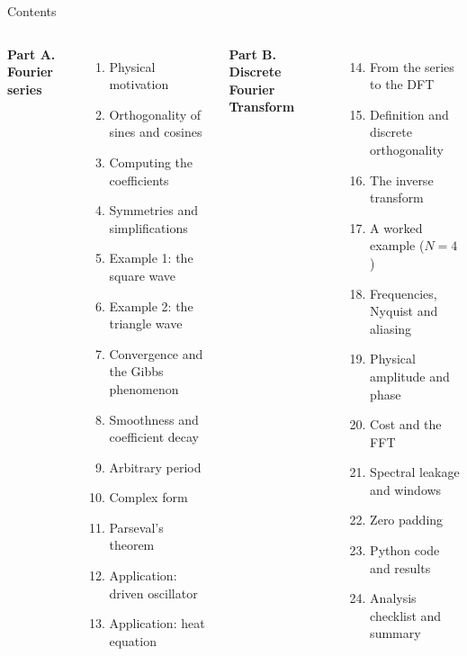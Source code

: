 \documentclass[aspectratio=169,10pt]{beamer}
\begin{document}
\begin{frame}{Contents}
  \footnotesize
  \begin{columns}[T]
    \textbf{Part A. Fourier series}
    \begin{enumerate}
      \item Physical motivation
      \item Orthogonality of sines and cosines
      \item Computing the coefficients
      \item Symmetries and simplifications
      \item Example 1: the square wave
      \item Example 2: the triangle wave
      \item Convergence and the Gibbs phenomenon
      \item Smoothness and coefficient decay
      \item Arbitrary period
      \item Complex form
      \item Parseval's theorem
      \item Application: driven oscillator
      \item Application: heat equation
    \end{enumerate}
    \textbf{Part B. Discrete Fourier Transform}
    \begin{enumerate}\setcounter{enumi}{13}
      \item From the series to the DFT
      \item Definition and discrete orthogonality
      \item The inverse transform
      \item A worked example ($N=4$)
      \item Frequencies, Nyquist and aliasing
      \item Physical amplitude and phase
      \item Cost and the FFT
      \item Spectral leakage and windows
      \item Zero padding
      \item Python code and results
      \item Analysis checklist and summary
    \end{enumerate}
  \end{columns}
\end{frame}
\end{document}
